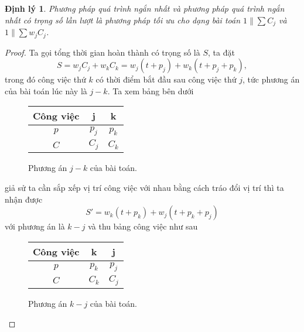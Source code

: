 \documentclass[12pt,a4paper]{report}
\newtheorem{dl}{Định lý}
\begin{document}
\begin{dl}
	Phương pháp quá trình ngắn nhất và phương pháp quá trình ngắn nhất có trọng số lần lượt là phương pháp tối ưu cho dạng bài toán $1 \| \sum C_j$ và $1 \| \sum w_j C_j$.
\end{dl}

\begin{proof}
	Ta gọi tổng thời gian hoàn thành có trọng số là $S$, ta đặt
	\begin{equation} \label{S}
		S = w_j C_j + w_k C_k = w_j(t+p_j) + w_k(t+p_j+p_k),
	\end{equation}
	trong đó công việc thứ $k$ có thời điểm bắt đầu sau công việc thứ $j$, tức phương án của bài toán lúc này là $j - k$. Ta xem bảng bên dưới
	
	\begin{figure}[h!]
		\centering
		 \begin{tabular}{|c | c c |} 
		 \hline
		 Công việc & j & k \\
		 \hline\hline
		 $p$ & $p_j$ & $p_k$ \\
		 $C$ & $C_j$ & $C_k$ \\
		 \hline
		 \end{tabular}
	\caption{Phương án $j - k$ của bài toán.}
	\end{figure}
	
	giả sử ta cần sắp xếp vị trí công việc với nhau bằng cách tráo đổi vị trí thì ta nhận được
	\begin{equation} \label{S'}
		S' = w_k(t+p_k) + w_j(t+p_k+p_j)
	\end{equation}
	với phương án là $k-j$ và thu bảng công việc như sau
	
	\begin{figure}[h!]
		\centering
		 \begin{tabular}{|c | c c |} 
		 \hline
		 Công việc & k & j \\
		 \hline\hline
		 $p$ & $p_k$ & $p_j$ \\
		 $C$ & $C_k$ & $C_j$ \\
		 \hline
		 \end{tabular}
	\caption{Phương án $k - j$ của bài toán.}
	\end{figure}


\end{proof}
\end{document}
